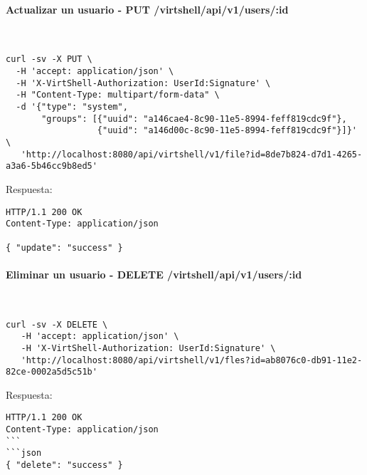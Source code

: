 \paragraph{Actualizar un usuario - PUT /virtshell/api/v1/users/:id} ~\\

\begin{lstlisting}[style=json]
curl -sv -X PUT \
  -H 'accept: application/json' \
  -H 'X-VirtShell-Authorization: UserId:Signature' \
  -H "Content-Type: multipart/form-data" \
  -d '{"type": "system",
       "groups": [{"uuid": "a146cae4-8c90-11e5-8994-feff819cdc9f"},
                  {"uuid": "a146d00c-8c90-11e5-8994-feff819cdc9f"}]}' \
   'http://localhost:8080/api/virtshell/v1/file?id=8de7b824-d7d1-4265-a3a6-5b46cc9b8ed5'
\end{lstlisting}

\vspace{1cm}
Respuesta:
\vspace{1cm}

\begin{lstlisting}[style=json]
HTTP/1.1 200 OK
Content-Type: application/json

{ "update": "success" }
\end{lstlisting}


\paragraph{Eliminar un usuario - DELETE /virtshell/api/v1/users/:id} ~\\

\begin{lstlisting}[style=json]
curl -sv -X DELETE \
   -H 'accept: application/json' \
   -H 'X-VirtShell-Authorization: UserId:Signature' \
   'http://localhost:8080/api/virtshell/v1/fles?id=ab8076c0-db91-11e2-82ce-0002a5d5c51b'
\end{lstlisting}

\vspace{1cm}
Respuesta:
\vspace{1cm}

\begin{lstlisting}[style=json]
HTTP/1.1 200 OK
Content-Type: application/json
```
```json
{ "delete": "success" }
\end{lstlisting}




